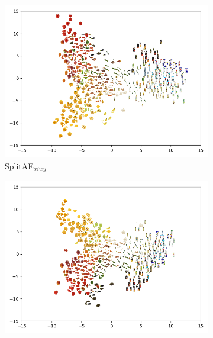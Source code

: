 
\begin{figure}[t]
     \centering
     \begin{subfigure}[b]{0.40\textwidth}
         \centering
         \includegraphics[width=\textwidth]{PaperB/figures_and_tables/latent_space_visualizations/splitae_vcca_comparison/pca_latents_splitae_xiwy_seed2.png}
         \caption{SplitAE$_{xiwy}$}
         \label{fig:splitae_xiwy_comparison}
     \end{subfigure}
     \begin{subfigure}[b]{0.40\textwidth}
         \centering
         \includegraphics[width=\textwidth]{PaperB/figures_and_tables/latent_space_visualizations/splitae_vcca_comparison/pca_latents_vcca_xiwy_seed2.png}

\end{subfigure}
\end{figure}
